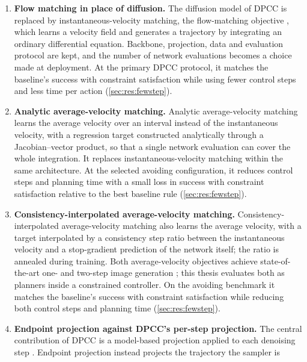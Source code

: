 \documentclass[headsepline,footsepline,footinclude=false,oneside,fontsize=11pt,paper=a4,listof=totoc,bibliography=totoc]{scrbook}
\theoremstyle{definition}
\theoremstyle{plain}
\theoremstyle{remark}
\begin{document}
\begin{enumerate}
  \item \textbf{Flow matching in place of diffusion.} The diffusion model of \ac{DPCC}
    \parencite{romer2025diffusion} is replaced by instantaneous-velocity matching, the flow-matching
    objective \parencite{lipman2023flow,lipman2024guide}, which learns a velocity field and generates a
    trajectory by integrating an ordinary differential equation. Backbone, projection, data and
    evaluation protocol are kept, and the number of network evaluations becomes a choice made at
    deployment.
    At the primary DPCC protocol, it matches the baseline's success with constraint satisfaction
    while using fewer control steps and less time per action (\autoref{sec:res:fewstep}).
  \item \textbf{Analytic average-velocity matching.} Analytic average-velocity matching
    \parencite{geng2025meanflow} learns the average velocity over an interval instead of the
    instantaneous velocity, with a regression target constructed analytically through a
    Jacobian--vector product, so that a single network evaluation can cover the whole integration. It
    replaces instantaneous-velocity matching within the same architecture.
    At the selected avoiding configuration, it reduces control steps and planning time with a small
    loss in success with constraint satisfaction relative to the best baseline rule
    (\autoref{sec:res:fewstep}).
  \item \textbf{Consistency-interpolated average-velocity matching.} Consistency-interpolated
    average-velocity matching \parencite{zhang2025alphaflow} also learns the average velocity, with a
    target interpolated by a consistency step ratio between the instantaneous velocity and a
    stop-gradient prediction of the network itself; the ratio is annealed during training. Both
    average-velocity objectives achieve state-of-the-art one- and two-step image generation
    \parencite{geng2025meanflow,zhang2025alphaflow}; this thesis evaluates both as planners inside a
    constrained controller.
    On the avoiding benchmark it matches the baseline's success with constraint satisfaction
    while reducing both control steps and planning time (\autoref{sec:res:fewstep}).
  \item \textbf{Endpoint projection against DPCC's per-step projection.} The central contribution of
    DPCC is a model-based projection applied to each denoising step \parencite{romer2025diffusion}.
    Endpoint projection \parencite{li2025hardflow} instead projects the trajectory the sampler is

\end{enumerate}
\end{document}
